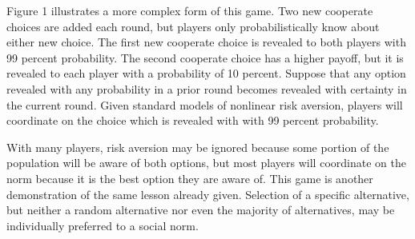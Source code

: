 \documentclass[AER]{./aea-latex-templates/AEA}
\begin{document}
Figure 1 illustrates a more complex form of this game. Two new cooperate
choices are added each round, but
players only probabilistically know about either new choice. The first new cooperate choice is
revealed to both players with 99 percent probability. The second cooperate
choice has a higher payoff, but it is revealed to
each player with a probability of 10 percent. Suppose that any option
revealed with any probability in a prior round becomes revealed with certainty in the current round. Given standard models of nonlinear
risk aversion, players will coordinate on the choice which is revealed
with with 99 percent probability.

With many players, risk aversion may be ignored because
some portion of the population will be aware of both options, but most
players will coordinate on the norm because it is the best option they are aware of.
This game is another demonstration of the same lesson already given. Selection of
a specific alternative, but neither a random alternative nor even the majority of
alternatives, may be individually preferred to a social norm.
\end{document}

